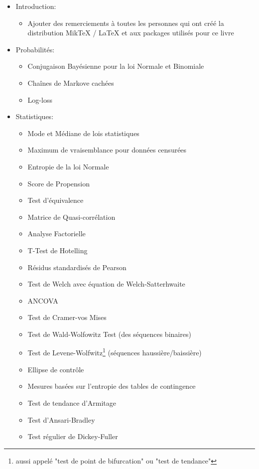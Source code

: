 	\begin{itemize}
		\item Introduction:
			\begin{itemize}
				\item Ajouter des remerciements à toutes les personnes qui ont cr\'e\'e la distribution MikTeX / LaTeX et aux packages utilis\'es pour ce livre
			\end{itemize}
		\item Probabilit\'es:
			\begin{itemize}
				\item Conjugaison Bay\'esienne pour la loi Normale et Binomiale
				\item Chaînes de Markove cach\'ees
				\item Log-loss
			\end{itemize}
		\item Statistiques: 
			\begin{itemize}
				\item Mode et M\'ediane de lois statistiques
				\item Maximum de vraisemblance pour donn\'ees censur\'ees
				\item Entropie de la loi Normale
				\item Score de Propension
				\item Test d'\'equivalence
				\item Matrice de Quasi-corr\'elation
				\item Analyse Factorielle
				\item T-Test de Hotelling
				\item R\'esidus standardis\'es de Pearson
				\item Test de Welch avec \'equation de Welch-Satterhwaite
				\item ANCOVA
				\item Test de Cramer-vos Mises
				\item Test de Wald-Wolfowitz Test (des s\'equences binaires)
				\item Test de Levene-Wolfwitz\footnote{aussi appel\'e  "test de point de bifurcation" ou "test de tendance"} (s\'equences haussière/baissière)
				\item Ellipse de contrôle
				\item Mesures bas\'ees sur l'entropie des tables de contingence
				\item Test de tendance d'Armitage
				\item Test d'Ansari-Bradley
				\item Test r\'egulier de Dickey-Fuller

\end{itemize}
\end{itemize}
